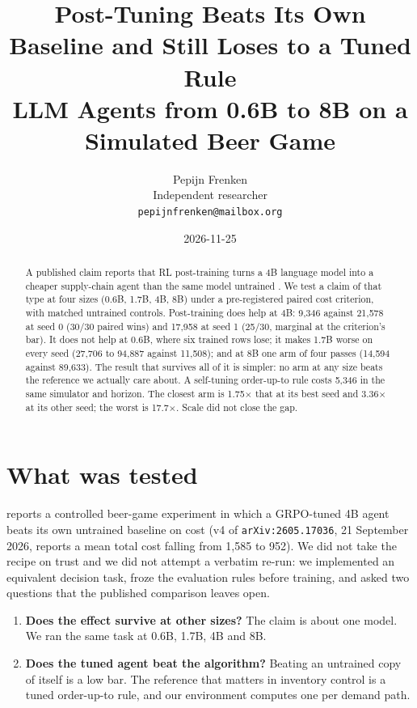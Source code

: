 \documentclass[11pt]{article}
\title{Post-Tuning Beats Its Own Baseline and Still Loses to a Tuned Rule\\[4pt]
{\large LLM Agents from 0.6B to 8B on a Simulated Beer Game}}
\author{Pepijn Frenken\\
Independent researcher\\
\texttt{pepijnfrenken@mailbox.org}}
\date{2026-11-25}
\begin{document}
\maketitle

\begin{abstract}
A published claim reports that RL post-training turns a 4B language model into a cheaper supply-chain
agent than the same model untrained \cite{long2026}. We test a claim of that type at four sizes
(0.6B, 1.7B, 4B, 8B) under a pre-registered paired cost criterion, with matched untrained controls.
Post-training does help at 4B: 9{,}346 against 21{,}578 at seed 0 (30/30 paired wins) and 17{,}958
at seed 1 (25/30, marginal at the criterion's bar). It does not help at 0.6B, where six trained rows lose; it makes 1.7B worse on
every seed (27{,}706 to 94{,}887 against 11{,}508); and at 8B one arm of four passes (14{,}594
against 89{,}633). The result that survives all of it is simpler: no arm at any size beats the
reference we actually care about. A self-tuning order-up-to rule costs 5{,}346 in the same
simulator and horizon. The closest arm is 1.75$\times$ that at its best seed and 3.36$\times$ at its other seed; the
worst is 17.7$\times$. Scale did not close the gap.
\end{abstract}

\section{What was tested}

\cite{long2026} reports a controlled beer-game experiment in which a GRPO-tuned 4B agent beats its
own untrained baseline on cost (v4 of \texttt{arXiv:2605.17036}, 21 September 2026, reports a mean
total cost falling from 1{,}585 to 952). We did not take the recipe on trust and we did not attempt a
verbatim re-run: we implemented an equivalent decision task, froze the evaluation rules before
training, and asked two questions that the published comparison leaves open.

\begin{enumerate}
  \item \textbf{Does the effect survive at other sizes?} The claim is about one model. We ran the same
  task at 0.6B, 1.7B, 4B and 8B.
  \item \textbf{Does the tuned agent beat the algorithm?} Beating an untrained copy of itself is a low
  bar. The reference that matters in inventory control is a tuned order-up-to rule, and our
  environment computes one per demand path.
\end{enumerate}
\end{document}
